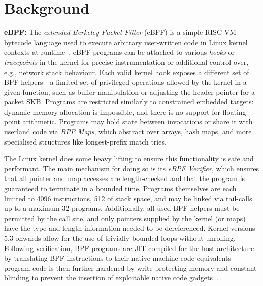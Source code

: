 \documentclass[comsoc, conference, times]{IEEEtran}
\newcommand{\fakepara}[1]{\noindent\textbf{#1:}}
\begin{document}
\section{Background}\label{sec:background}

\fakepara{eBPF}
The \emph{extended Berkeley Packet Filter} (eBPF) is a simple RISC VM bytecode language used to execute arbitrary user-written code in Linux kernel contexts at runtime~\parencite{ebpf-history}.
eBPF programs can be attached to various \emph{hooks} or \emph{tracepoints} in the kernel for precise instrumentation or additional control over, e.g., network stack behaviour.
Each valid kernel hook exposes a different set of BPF helpers---a limited set of privileged operations allowed by the kernel in a given function, such as buffer manipulation or adjusting the header pointer for a packet SKB.
Programs are restricted similarly to constrained embedded targets: dynamic memory allocation is impossible, and there is no support for floating point arithmetic.
Programs may hold state between invocations or share it with userland code via \emph{BPF Maps}, which abstract over arrays, hash maps, and more specialised structures like longest-prefix match tries.

The Linux kernel does some heavy lifting to ensure this functionality is safe and performant.
The main mechanism for doing so is its \emph{eBPF Verifier}, which ensures that all pointer and map accesses are length-checked and that the program is guaranteed to terminate in a bounded time.
Programs themselves are each limited to \num{4096} instructions, \qty{512}{\byte} of stack space, and may be linked via tail-calls up to a maximum \num{32} programs.
Additionally, all used BPF helpers must be permitted by the call site, and only pointers supplied by the kernel (or maps) have the type and length information needed to be dereferenced.
Kernel versions 5.3 onwards allow for the use of trivially bounded loops without unrolling. %
Following verification, BPF programs are JIT-compiled for the host architecture by translating BPF instructions to their native machine code equivalents---program code is then further hardened by write protecting memory and constant blinding to prevent the insertion of exploitable native code gadgets~\parencite{jit-spraying-bpf}.
\end{document}
